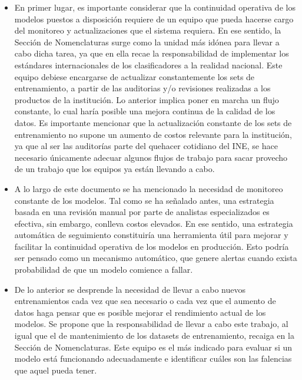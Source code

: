 \documentclass[
  12pt,
  spanish,
]{article}
\begin{document}
\begin{itemize}

  \item En primer lugar, es importante considerar que la continuidad operativa de los modelos puestos a disposición requiere de un equipo que pueda hacerse cargo del monitoreo y actualizaciones que el sistema requiera. En ese sentido, la Sección de Nomenclaturas surge como la unidad más idónea para llevar a cabo dicha tarea, ya que en ella recae la responsabilidad de implementar los estándares internacionales de los clasificadores a la realidad nacional. Este equipo debiese encargarse de actualizar constantemente los sets de entrenamiento, a partir de las auditorias y/o revisiones realizadas a los productos de la institución. Lo anterior implica poner en marcha un flujo constante, lo cual haría posible una mejora continua de la calidad de los datos. Es importante mencionar que la actualización constante de los sets de entrenamiento no supone un aumento de costos relevante para la institución, ya que al ser las auditorías parte del quehacer cotidiano del INE, se hace necesario únicamente adecuar algunos flujos de trabajo para sacar provecho de un trabajo que los equipos ya están llevando a cabo.  

  \item A lo largo de este documento se ha mencionado la necesidad de monitoreo constante de los modelos. Tal como se ha señalado antes, una estrategia basada en una revisión manual por parte de analistas especializados es efectiva, sin embargo, conlleva costos elevados. En ese sentido, una estrategia automática de seguimiento constituiría una herramienta útil para mejorar y facilitar la continuidad operativa de los modelos en producción. Esto podría ser pensado como un mecanismo automático, que genere alertas cuando exista probabilidad de que un modelo comience a fallar. 

  \item De lo anterior se desprende la necesidad de llevar a cabo nuevos entrenamientos cada vez que sea necesario o cada vez que el aumento de datos haga pensar que es posible mejorar el rendimiento actual de los modelos. Se propone que la responsabilidad de llevar a cabo este trabajo, al igual que el de mantenimiento de los datasets de entrenamiento, recaiga en la Sección de Nomenclaturas. Este equipo es el más indicado para evaluar si un modelo está funcionando adecuadamente e identificar cuáles son las falencias que aquel pueda tener.       


\end{itemize}
\end{document}
